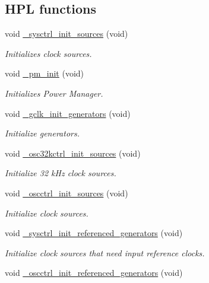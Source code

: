 \subsection*{H\+PL functions}
\begin{DoxyCompactItemize}
\item 
void \hyperlink{group___h_p_l_ga11bde7accfa853194b32dae4f27bad40}{\+\_\+sysctrl\+\_\+init\+\_\+sources} (void)
\begin{DoxyCompactList}\small\item\em Initializes clock sources. \end{DoxyCompactList}\item 
void \hyperlink{group___h_p_l_ga0e9b9fbf16506f0f6ad8e8b1aa87dc73}{\+\_\+pm\+\_\+init} (void)
\begin{DoxyCompactList}\small\item\em Initializes Power Manager. \end{DoxyCompactList}\item 
void \hyperlink{group___h_p_l_ga87e8c45b05aee8f3b453630134d3483d}{\+\_\+gclk\+\_\+init\+\_\+generators} (void)
\begin{DoxyCompactList}\small\item\em Initialize generators. \end{DoxyCompactList}\item 
void \hyperlink{group___h_p_l_gaab304aa890beb23e3311aaa2c0def527}{\+\_\+osc32kctrl\+\_\+init\+\_\+sources} (void)
\begin{DoxyCompactList}\small\item\em Initialize 32 k\+Hz clock sources. \end{DoxyCompactList}\item 
void \hyperlink{group___h_p_l_gaee0105b1dbc07a2ca23586aa95f49cc7}{\+\_\+oscctrl\+\_\+init\+\_\+sources} (void)
\begin{DoxyCompactList}\small\item\em Initialize clock sources. \end{DoxyCompactList}\item 
void \hyperlink{group___h_p_l_ga3e5e49081818470968093b6e3597ab5f}{\+\_\+sysctrl\+\_\+init\+\_\+referenced\+\_\+generators} (void)
\begin{DoxyCompactList}\small\item\em Initialize clock sources that need input reference clocks. \end{DoxyCompactList}\item 
void \hyperlink{group___h_p_l_ga2e4746bc23999fe1dc7c02aa4e167bfb}{\+\_\+oscctrl\+\_\+init\+\_\+referenced\+\_\+generators} (void)

\end{DoxyCompactItemize}

